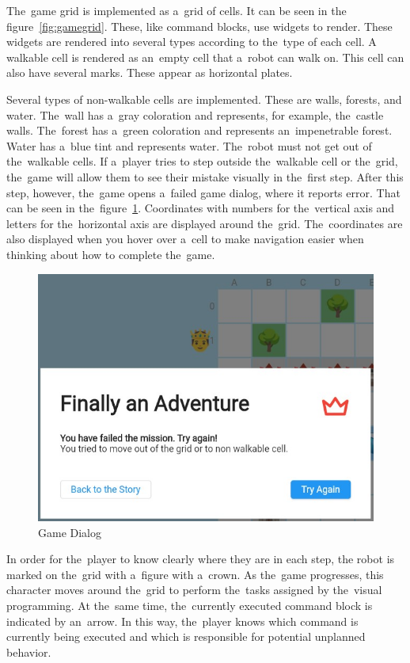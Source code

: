 The~game grid is implemented as a~grid of cells.
It can be seen in the figure~\ref{fig:gamegrid}.
These, like command blocks, use widgets to render.
These widgets are rendered into several types according to the~type of each cell.
A walkable cell is rendered as an~empty cell that a~robot can walk on.
This cell can also have several marks.
These appear as horizontal plates.

Several types of non-walkable cells are implemented.
These are walls, forests, and water.
The~wall has a~gray coloration and represents, for example, the~castle walls.
The~forest has a~green coloration and represents an~impenetrable forest.
Water has a~blue tint and represents water.
The~robot must not get out of the~walkable cells.
If a~player tries to step outside the~walkable cell or the~grid, the~game will allow them to see their mistake visually in the~first step.
After this step, however, the~game opens a~failed game dialog, where it reports error.
That can be seen in the~figure~\ref{fig:gamedialog}.
Coordinates with numbers for the~vertical axis and letters for the~horizontal axis are displayed around the~grid.
The~coordinates are also displayed when you hover over a~cell to make navigation easier when thinking about how to complete the~game.

\begin{figure}
    \centering
    \includegraphics[width=0.7\linewidth]{assets/implementation/gamedialog.jpeg}
    \caption{Game Dialog}
    \label{fig:gamedialog}
\end{figure}

\pagebreak

In order for the~player to know clearly where they are in each step, the robot is marked on the~grid with a~figure with a~crown.
As the~game progresses, this character moves around the~grid to perform the~tasks assigned by the~visual programming.
At the~same time, the~currently executed command block is indicated by an~arrow.
In this way, the~player knows which command is currently being executed and which is responsible for potential unplanned behavior.

